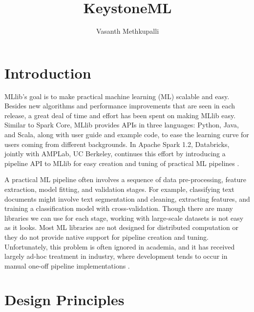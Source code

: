 \documentclass[9pt,twocolumn,twoside]{../../styles/osajnl}
\title{KeystoneML}
\author[1,*]{Vasanth Methkupalli}
\affil[1]{School of Informatics and Computing, Bloomington, IN 47408, U.S.A.}
\affil[*]{Corresponding authors: mvasanthiiit@gmail.com}
\begin{document}
\maketitle
{}

\section{Introduction}

MLlib’s goal is to make practical machine learning (ML) scalable and
easy. Besides new algorithms and performance improvements that are
seen in each release, a great deal of time and effort has been spent
on making MLlib easy. Similar to Spark Core, MLlib provides APIs in
three languages: Python, Java, and Scala, along with user guide and
example code, to ease the learning curve for users coming from
different backgrounds. In Apache Spark 1.2, Databricks, jointly with
AMPLab, UC Berkeley, continues this effort by introducing a pipeline
API to MLlib for easy creation and tuning of practical ML
pipelines \cite{meng2016mllib} .

A practical ML pipeline often involves a sequence of data
pre-processing, feature extraction, model fitting, and validation
stages. For example, classifying text documents might involve text
segmentation and cleaning, extracting features, and training a
classification model with cross-validation. Though there are many
libraries we can use for each stage, working with large-scale datasets
is not easy as it looks. Most ML libraries are not designed for
distributed computation or they do not provide native support for
pipeline creation and tuning. Unfortunately, this problem is often
ignored in academia, and it has received largely ad-hoc treatment in
industry, where development tends to occur in manual one-off pipeline
implementations \cite{meng2016mllib} .

\section{Design Principles}
\end{document}
